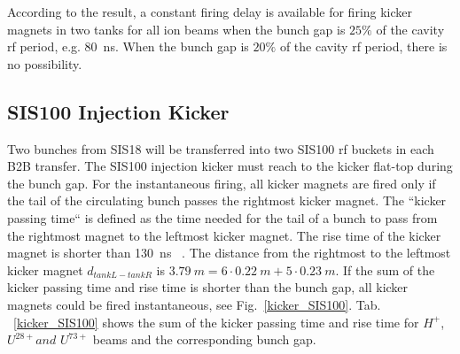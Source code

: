 \begin{table}[H]
\end{table}
According to the result, a constant firing delay is available for firing kicker magnets in two tanks for all ion beams when the bunch gap is $25\%$ of the cavity rf period, e.g. \SI{80}{ns}. When the bunch gap is $20\%$ of the cavity rf period, there is no possibility.  

\subsection{SIS100 Injection Kicker}
Two bunches from SIS18 will be transferred into two SIS100 rf buckets in each B2B transfer. The SIS100 injection kicker must reach to the kicker flat-top during the bunch gap. For the instantaneous firing, all kicker magnets are fired only if the tail of the circulating bunch passes the rightmost kicker magnet. The ``kicker passing time`` is defined as the time needed for the tail of a bunch to pass from the rightmost magnet to the leftmost kicker magnet. The rise time of the kicker magnet is shorter than \SI{130}{ns} ~\cite{blell_detailed_2014}. The distance from the rightmost to the leftmost kicker magnet $d_\mathit{tankL-tankR}$ is $\SI{3.79}{m}= 6 \cdot \SI{0.22}{m} + 5 \cdot \SI{0.23}{m}$. If the sum of the kicker passing time and rise time is shorter than the bunch gap, all kicker magnets could be fired instantaneous, see Fig.~\ref{kicker_SIS100}. Tab. ~\ref{kicker_SIS100} shows the sum of the kicker passing time and rise time for $H^+$, $U^{28+} and$ $U^{73+}$ beams and the corresponding bunch gap. 

